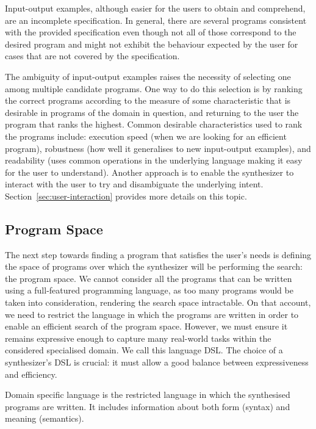 Input-output examples, although easier for the users to obtain and comprehend, are an incomplete specification. In general, there are several programs consistent with the provided specification even though not all of those correspond to the desired program and might not exhibit the behaviour expected by the user for cases that are not covered by the specification.

The ambiguity of input-output examples raises the necessity of selecting one among multiple candidate programs. One way to do this selection is by ranking the correct programs according to the measure of some characteristic that is desirable in programs of the domain in question, and returning to the user the program that ranks the highest.
Common desirable characteristics used to rank the programs include: execution speed (when we are looking for an efficient program), robustness (how well it generalises to new input-output examples), and readability (uses common operations in the underlying language making it easy for the user to understand).
Another approach is to enable the synthesizer to interact with the user to try and disambiguate the underlying intent. Section~\ref{sec:user-interaction} provides more details on this topic.

\subsection{Program Space} \label{sec:program-space}
The next step towards finding a program that satisfies the user's needs is defining the space of programs over which the synthesizer will be performing the search: the program space.
We cannot consider all the programs that can be written using a full-featured programming language, as too many programs would be taken into consideration, rendering the search space intractable.
On that account, we need to restrict the language in which the programs are written in order to enable an efficient search of the program space.
However, we must ensure it remains expressive enough to capture many real-world tasks within the considered specialised domain.
We call this language \acf{DSL}.
The choice of a synthesizer's \ac{DSL} is crucial: it must allow a good balance between expressiveness and efficiency.

\begin{definition}
Domain specific language is the restricted language in which the synthesised programs are written. It includes information about both form (syntax) and meaning (semantics).
\end{definition}


